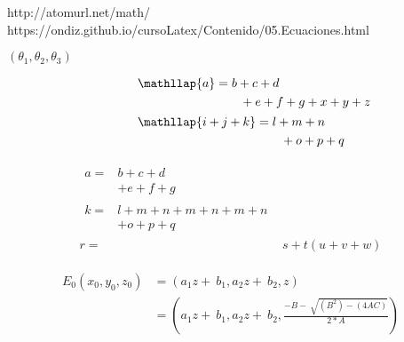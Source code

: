 http://atomurl.net/math/
https://ondiz.github.io/cursoLatex/Contenido/05.Ecuaciones.html

      
      $({\theta }_1,{\theta }_2,{\theta }_3)$
      
      
          \begin{align}
        \phantom{i + j + k}
         &
         \begin{aligned}
            \mathllap{a} & = b + c + d\\ &\qquad + e + f + g + x + y + z
         \end{aligned}\\
         &
         \begin{aligned}
            \mathllap{i + j + k} & = l + m + n\\ &\qquad + o + p + q
         \end{aligned}
    \end{align}
    
    \begin{align}
\begin{split}\label{eq:1}
    a ={}& b + c + d\\
         & + e + f + g
\end{split}\\
\begin{split}\label{eq:2}
    k ={}& l + m + n + m + n + m + n\\
         & + o + p + q
\end{split}\\
    r ={}& s + t (u + v + w)\label{eq:3}
\end{align}
    
    \begin{align}
\begin{split}\label{eq:cap4_eq_3}
    E_0\left(x_0,y_0,z_0\right)& ={} \left(a_1z+\ b_1,a_2z+\ b_2,z\right)\\
         & ={} \left(a_1z+\ b_1,a_2z+\ b_2,\frac{-B-\ \sqrt{\left(B^2\right)-\left(4AC\right)}}{2*A}\right)\\
\end{split}\\
\end{align}
    
